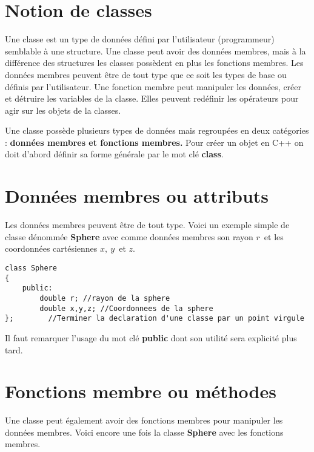 \documentclass[a4paper, oneside,11pt]{book}
\begin{document}
\section{Notion de classes}
Une classe est un type de donn\'ees d\'efini par l'utilisateur (programmeur) semblable \`a une structure. Une classe peut avoir des donn\'ees membres, mais \`a la diff\'erence des 
structures les classes poss\`edent en plus les fonctions membres. Les donn\'ees membres peuvent \^etre de tout type que ce soit les types de base ou d\'efinis par l'utilisateur.
Une fonction membre peut manipuler les donn\'ees, cr\'eer et d\'etruire les variables de la classe. Elles peuvent red\'efinir les op\'erateurs pour agir sur les objets de la classes.

Une classe poss\`ede plusieurs types de donn\'ees mais regroup\'ees en deux cat\'egories : \textbf{donn\'ees membres et fonctions membres.} Pour cr\'eer un objet en C++ on doit 
d'abord d\'efinir sa forme g\'en\'erale par le mot cl\'e \textbf{class}.

\section{Donn\'ees membres ou attributs}

Les donn\'ees membres peuvent \^etre de tout type. Voici un exemple simple de classe d\'enomm\'ee \textbf{Sphere} avec comme donn\'ees membres son rayon $r$\ et les coordonn\'ees
cart\'esiennes $x,\ y$\ et $z$.

\begin{lstlisting}
class Sphere
{
    public:
        double r; //rayon de la sphere
        double x,y,z; //Coordonnees de la sphere
};        //Terminer la declaration d'une classe par un point virgule
\end{lstlisting} 
Il faut remarquer l'usage du mot cl\'e \textbf{public} dont son utilit\'e sera explicit\'e plus tard.
\section{Fonctions membre ou m\'ethodes} 

Une classe peut \'egalement avoir des fonctions membres pour manipuler les donn\'ees membres. Voici encore une fois la classe \textbf{Sphere} avec les fonctions membres. 
\end{document}
